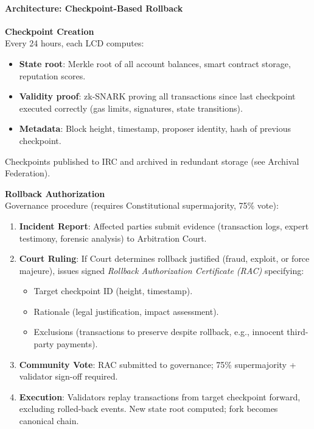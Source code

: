 \documentclass[11pt]{article}
\begin{document}
\paragraph{Architecture: Checkpoint-Based Rollback}
\textbf{Checkpoint Creation}\\
Every 24 hours, each LCD computes:
\begin{itemize}[noitemsep]
  \item \textbf{State root}: Merkle root of all account balances, smart contract storage, reputation scores.
  \item \textbf{Validity proof}: zk-SNARK proving all transactions since last checkpoint executed correctly (gas limits, signatures, state transitions).
  \item \textbf{Metadata}: Block height, timestamp, proposer identity, hash of previous checkpoint.
\end{itemize}
Checkpoints published to IRC and archived in redundant storage (see Archival Federation).

\textbf{Rollback Authorization}\\
Governance procedure (requires Constitutional supermajority, 75\% vote):
\begin{enumerate}[noitemsep]
  \item \textbf{Incident Report}: Affected parties submit evidence (transaction logs, expert testimony, forensic analysis) to Arbitration Court.
  \item \textbf{Court Ruling}: If Court determines rollback justified (fraud, exploit, or force majeure), issues signed \emph{Rollback Authorization Certificate (RAC)} specifying:
    \begin{itemize}[noitemsep]
      \item Target checkpoint ID (height, timestamp).
      \item Rationale (legal justification, impact assessment).
      \item Exclusions (transactions to preserve despite rollback, e.g., innocent third-party payments).
    \end{itemize}
  \item \textbf{Community Vote}: RAC submitted to governance; 75\% supermajority + validator sign-off required.
  \item \textbf{Execution}: Validators replay transactions from target checkpoint forward, excluding rolled-back events. New state root computed; fork becomes canonical chain.
\end{enumerate}
\end{document}
